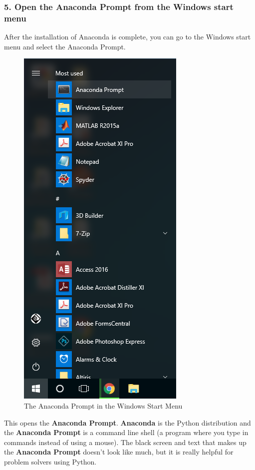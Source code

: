 \documentclass{book}
\makeatletter
\def\maxwidth{\ifdim\Gin@nat@width>\linewidth\linewidth
    \else\Gin@nat@width\fi}
\let\Oldincludegraphics\includegraphics
\renewcommand{\includegraphics}[1]{\Oldincludegraphics[width=.8\maxwidth]{#1}}
\makeatother
\begin{document}
    
        \subsubsection{5. Open the Anaconda Prompt from the Windows start
menu}\label{open-the-anaconda-prompt-from-the-windows-start-menu}

After the installation of Anaconda is complete, you can go to the
Windows start menu and select the Anaconda Prompt.

\begin{figure}
\centering
\includegraphics{images/anaconda_from_start_menu.png}
\caption{The Anaconda Prompt in the Windows Start Menu}
\end{figure}

This opens the \textbf{Anaconda Prompt}. \textbf{Anaconda} is the Python
distribution and the \textbf{Anaconda Prompt} is a command line shell (a
program where you type in commands instead of using a mouse). The black
screen and text that makes up the \textbf{Anaconda Prompt} doesn't look
like much, but it is really helpful for problem solvers using Python.
\end{document}
